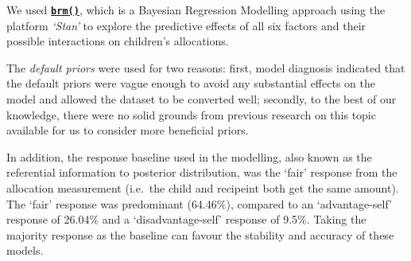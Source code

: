 \documentclass[
]{article}
\newenvironment{Shaded}{\begin{snugshade}}{\end{snugshade}}
\newcommand{\CommentTok}[1]{\textcolor[rgb]{0.56,0.35,0.01}{\textit{#1}}}
\newcommand{\DataTypeTok}[1]{\textcolor[rgb]{0.13,0.29,0.53}{#1}}
\newcommand{\KeywordTok}[1]{\textcolor[rgb]{0.13,0.29,0.53}{\textbf{#1}}}
\newcommand{\NormalTok}[1]{#1}
\newcommand{\OperatorTok}[1]{\textcolor[rgb]{0.81,0.36,0.00}{\textbf{#1}}}
\newcommand{\StringTok}[1]{\textcolor[rgb]{0.31,0.60,0.02}{#1}}
\begin{document}
We used
\href{https://cran.r-project.org/web/packages/brms/brms.pdf}{\textbf{\texttt{brm()}}},
which is a Bayesian Regression Modelling approach using the platform
\emph{`Stan'} to explore the predictive effects of all six factors and
their possible interactions on children's allocations.

The \emph{default priors} were used for two reasons: first, model
diagnosis indicated that the default priors were vague enough to avoid
any substantial effects on the model and allowed the dataset to be
converted well; secondly, to the best of our knowledge, there were no
solid grounds from previous research on this topic available for us to
consider more beneficial priors.

In addition, the response baseline used in the modelling, also known as
the referential information to posterior distribution, was the `fair'
response from the allocation measurement (i.e.~the child and recipeint
both get the same amount). The `fair' response was predominant
(64.46\%), compared to an `advantage-self' response of 26.04\% and a
`disadvantage-self' response of 9.5\%. Taking the majority response as
the baseline can favour the stability and accuracy of these models.

\begin{Shaded}
\end{Shaded}
\end{document}
